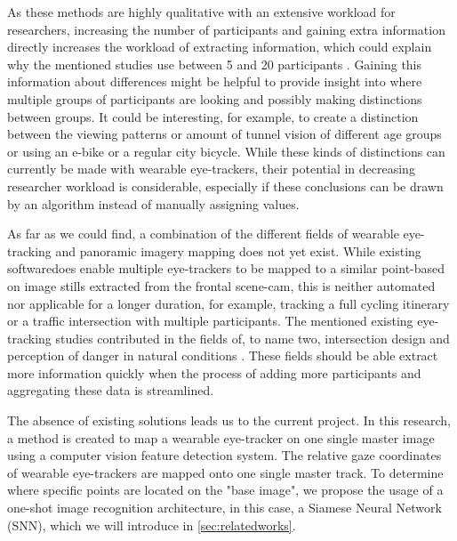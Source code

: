\documentclass[sigconf, natbib=false, nonacm]{acmart}
\begin{document}
    As these methods are highly qualitative with an extensive workload for researchers, increasing the number of participants and gaining extra information directly increases the workload of extracting information, which could explain why the mentioned studies use between 5 and 20 participants \cite{Rupi2019, Gruden2021, Trefzger2018}. Gaining this information about differences might be helpful to provide insight into where multiple groups of participants are looking and possibly making distinctions between groups. It could be interesting, for example, to create a distinction between the viewing patterns or amount of tunnel vision of different age groups or using an e-bike or a regular city bicycle. While these kinds of distinctions can currently be made with wearable eye-trackers, their potential in decreasing researcher workload is considerable, especially if these conclusions can be drawn by an algorithm instead of manually assigning values. 
    
    As far as we could find, a combination of the different fields of wearable eye-tracking and panoramic imagery mapping does not yet exist. While existing software\footnotemark does enable multiple eye-trackers to be mapped to a similar point-based on image stills extracted from the frontal scene-cam, this is neither automated nor applicable for a longer duration, for example, tracking a full cycling itinerary or a traffic intersection with multiple participants. The mentioned existing eye-tracking studies contributed in the fields of, to name two, intersection design \cite{Rupi2019, Werneke2012, Kovacsova2018, Mantuano2017a} and perception of danger in natural conditions \cite{Underwood2007, Liu2011, Lehtonen2016, VanGompel2007}. These fields should be able extract more information quickly when the process of adding more participants and aggregating these data is streamlined. 
    
        
    The absence of existing solutions leads us to the current project. In this research, a method is created to map a wearable eye-tracker on one single master image using a computer vision feature detection system. The relative gaze coordinates of wearable eye-trackers are mapped onto one single master track. To determine where specific points are located on the "base image", we propose the usage of a one-shot image recognition architecture, in this case, a Siamese Neural Network (SNN), which we will introduce in \autoref{sec:relatedworks}. 
    
\end{document}
